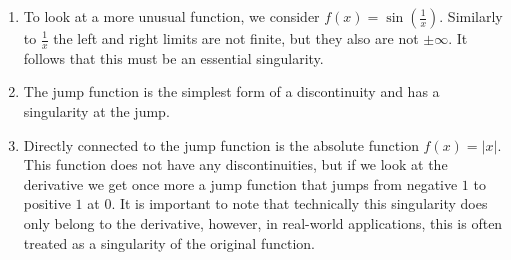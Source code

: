 \documentclass[journal]{IEEEtran}
\begin{document}
\begin{enumerate}
\item To look at a more unusual function, we consider $f(x) = \sin(\frac{1}{x})$. Similarly to $\frac{1}{x}$ the left and right limits are not finite, but they also are not $\pm \infty$. It follows that this must be an essential singularity.
\begin{figure}
\centering
{}
\end{figure}

\item The jump function is the simplest form of a discontinuity and has a singularity at the jump.
\begin{figure}
\centering
{}
\end{figure}

\item Directly connected to the jump function is the absolute function $f(x) = |x|$. This function does not have any discontinuities, but if we look at the derivative we get once more a jump function that jumps from negative $1$ to positive $1$ at 0. It is important to note that technically this singularity does only belong to the derivative, however, in real-world applications, this is often treated as a singularity of the original function.
\begin{figure}
\centering
{}
\end{figure}


\end{enumerate}
\end{document}
